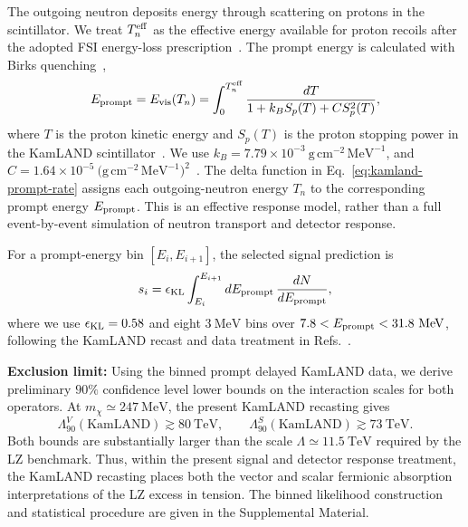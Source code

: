 \documentclass[aps,twocolumn,superscriptaddress,groupedaddress,nofootinbib,floatfix]{revtex4}
\begin{document}
The outgoing neutron deposits energy through scattering on protons in
the scintillator.  We treat $T_n^{\rm eff}$ as the effective energy
available for proton recoils after the adopted FSI energy-loss
prescription~\cite{Bodek:2019,Gong:2025ves}.  The prompt energy is calculated with Birks quenching~\cite{Birks:1951boa,Chou:1952},
\begin{equation}
E_{\rm prompt}=E_{\rm vis}(T_n)
=
\int_0^{T_n^{\rm eff}}
\frac{dT}
{1+k_B S_p(T)+C S_p^2(T)} ,
\label{eq:kamland-birks}
\end{equation}
where $T$ is the proton kinetic energy and $S_p(T)$ is the proton
stopping power in the KamLAND scintillator~\cite{Berger:1999}.  We use $k_B=7.79\times10^{-3}~
\mathrm{g\,cm^{-2}\,MeV^{-1}}$, and $C=1.64\times10^{-5}~
\bigl(\mathrm{g\,cm^{-2}\,MeV^{-1}}\bigr)^2$~\cite{Yoshida:2010zzb}.
The delta function in Eq.~\eqref{eq:kamland-prompt-rate} assigns each
outgoing-neutron energy $T_n$ to the corresponding prompt energy
$E_{\rm prompt}$.  This is an effective response model, rather than a
full event-by-event simulation of neutron transport and detector
response.

For a prompt-energy bin $[E_i,E_{i+1}]$, the selected signal prediction is
\begin{equation}
s_i
=
\epsilon_{\rm KL}
\int_{E_i}^{E_{i+1}}
dE_{\rm prompt}\,
\frac{dN}{dE_{\rm prompt}},
\label{eq:kamland-bin-signal}
\end{equation}
where we use $\epsilon_{\rm KL}=0.58$ and eight $3~\mathrm{MeV}$ bins
over $7.8<E_{\rm prompt}<31.8~\mathrm{MeV}$, following the KamLAND
recast and data treatment in
Refs.~\cite{Gong:2025ves,MeighenBerger:2023tad,KamLAND:2021gvi}.

\textbf{Exclusion limit:} Using the binned prompt delayed KamLAND data,
we derive preliminary $90\%$ confidence level lower bounds on the
interaction scales for both operators. At
$m_\chi \simeq 247~\mathrm{MeV}$, the present KamLAND recasting gives
\begin{equation}
\Lambda_{90}^{V}(\text{KamLAND})\gtrsim 80~\mathrm{TeV},
\qquad
\Lambda_{90}^{S}(\text{KamLAND})\gtrsim 73~\mathrm{TeV}.
\end{equation}
Both bounds are substantially larger than the scale
$\Lambda\simeq11.5~\mathrm{TeV}$ required by the LZ benchmark.
Thus, within the present signal and detector response treatment, the
KamLAND recasting places both the vector and scalar fermionic
absorption interpretations of the LZ excess in tension. The binned
likelihood construction and statistical procedure are given in the
Supplemental Material.
\end{document}
